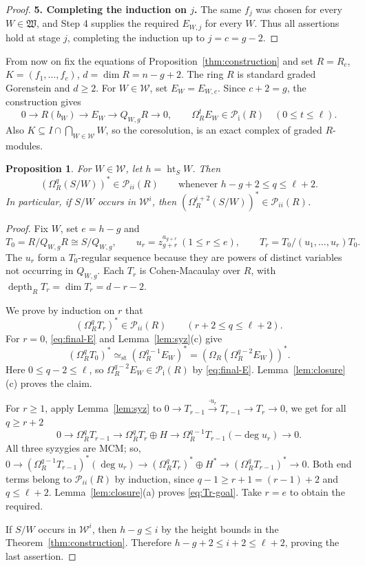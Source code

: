 \documentclass[11pt,letterpaper]{amsart}
\newcommand{\Pone}{\mathcal P_{\mathrm{i}}}
\newcommand{\st}{\simeq_{\mathrm{st}}}
\DeclareMathOperator{\heightideal}{ht}
\newcommand{\x}{\xrightarrow{}}
\newcommand{\sW}{\mathfrak W}
\DeclareMathOperator{\depth}{depth}
\theoremstyle{plain}
\newtheorem{prop}[thm]{Proposition}
\theoremstyle{definition}
\theoremstyle{remark}
\begin{document}
\begin{proof}
\smallskip\noindent\textbf{5. Completing the induction on \(j\).}
The same \(f_j\) was chosen for every \(W\in\sW\), and Step 4 supplies
the required \(E_{W,j}\) for every \(W\). Thus all assertions hold at
stage \(j\), completing the induction up to \(j=c=g-2\).
\end{proof}

From now on fix the equations of Proposition~\ref{thm:construction}
and set $R=R_c$, $K=(f_1,\ldots,f_c)$, $d=\dim R=n-g+2$. The ring $R$ is standard graded Gorenstein and $d\geq2$.
For $W\in\mathcal W$, set $E_W=E_{W,c}$.
Since $c+2=g$, the construction gives
\begin{equation}\label{eq:final-E}
 0\x R(b_W)\x E_W\x Q_{W,g}R\x0,
 \qquad
 \Omega_R^tE_W\in\Pone(R)\quad(0\leq t\leq\ell).
\end{equation}
Also $K\subseteq I\cap\bigcap_{W\in\mathcal W}W$, so the
coresolution, is an exact complex of
graded $R$-modules.

\begin{prop}\label{prop:all-heights}
For $W\in\mathcal W$, let $h=\heightideal_S W$. Then
\[\label{eq:all-heights}
 (\Omega_R^q(S/W))^*\in\mathcal{P}_{ii}(R)
 \qquad\text{whenever }h-g+2\leq q\leq\ell+2.
\]
In particular, if $S/W$ occurs in $\mathcal W^i$, then
$(\Omega_R^{i+2}(S/W))^*\in\mathcal{P}_{ii}(R)$.
\end{prop}

\begin{proof}
Fix $W$, set $e=h-g$ and
\[
 T_0=R/Q_{W,g}R\cong S/Q_{W,g},\qquad
 u_r=z_{g+r}^{a_{g+r}}\ (1\leq r\leq e),\qquad
 T_r=T_0/(u_1,\ldots,u_r)T_0.
\]
The $u_r$ form a $T_0$-regular sequence because they are powers
of distinct variables not occurring in $Q_{W,g}$. 
Each $T_r$ is Cohen-Macaulay over $R$, with $\depth_R T_r=\dim T_r=d-r-2$.

We prove by induction on $r$ that
\begin{equation}\label{eq:Tr-goal}
 (\Omega_R^qT_r)^*\in\mathcal{P}_{ii}(R)
 \qquad(r+2\leq q\leq\ell+2).
\end{equation}
For $r=0$, \eqref{eq:final-E} and
Lemma~\ref{lem:syz}(c) give
\[
 (\Omega_R^qT_0)^*
 \st(\Omega_R^{q-1}E_W)^*
 =(\Omega_R(\Omega_R^{q-2}E_W))^*.
\]
Here $0\leq q-2\leq\ell$, so
$\Omega_R^{q-2}E_W\in\Pone(R)$ by
\eqref{eq:final-E}. Lemma~\ref{lem:closure}(c) proves the claim.

For $r\geq1$, apply Lemma~\ref{lem:syz} to $0\x T_{r-1}\xrightarrow{\cdot u_r}T_{r-1}\x T_r\x 0$, we get for all $q\geq r+2$
\[
 0\x\Omega_R^qT_{r-1}
 \x\Omega_R^qT_r\oplus H
 \x\Omega_R^{q-1}T_{r-1}(-\deg u_r)\x 0.
\]
All three syzygies are MCM; so, $0\x(\Omega_R^{q-1}T_{r-1})^*(\deg u_r)
 \x(\Omega_R^qT_r)^*\oplus H^*\x(\Omega_R^qT_{r-1})^*\x0$.
Both end terms belong to $\mathcal{P}_{ii}(R)$ by induction, since
$q-1\geq r+1=(r-1)+2$ and $q\leq\ell+2$.
Lemma~\ref{lem:closure}(a) proves \eqref{eq:Tr-goal}.
Take $r=e$ to obtain the required.

If $S/W$ occurs in $\mathcal W^i$, then
$h-g\leq i$ by the height bounds in the Theorem~\ref{thm:construction}. Therefore
$h-g+2\leq i+2\leq\ell+2$, proving the last assertion.
\end{proof}
\end{document}
